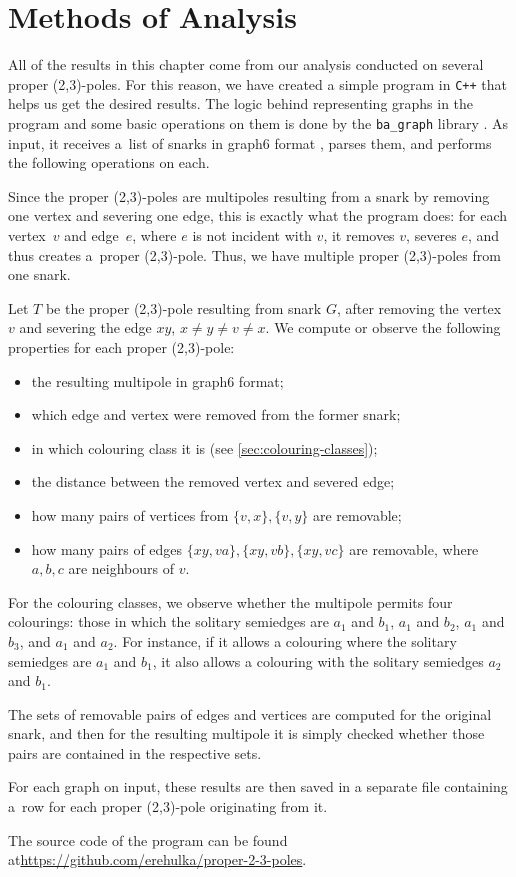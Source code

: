 \section{Methods of Analysis}\label{sec:analysis}

All of the results in this chapter come from our analysis conducted on several proper (2,3)-poles. For this reason, we have created a simple program in \texttt{C++} that helps us get the desired results. The logic behind representing graphs in the program and some basic operations on them is done by the \texttt{ba\_graph} library \cite{ba-graph}. As input, it receives a~list of snarks in graph6 format \cite{mckay_formats}, parses them, and performs the following operations on each.

Since the proper (2,3)-poles are multipoles resulting from a snark by removing one vertex and severing one edge, this is exactly what the program does: for each vertex~$v$ and edge~$e$, where $e$ is not incident with $v$, it removes $v$, severes $e$, and thus creates a~proper (2,3)-pole. Thus, we have multiple proper (2,3)-poles from one snark.

Let $T$ be the proper (2,3)-pole resulting from snark $G$, after removing the vertex $v$ and severing the edge $xy$, $x\neq y\neq v\neq x$. We compute or observe the following properties for each proper (2,3)-pole:

\begin{itemize}
	\item the resulting multipole in graph6 format;
	\item which edge and vertex were removed from the former snark;
	\item in which colouring class it is (see \cref{sec:colouring-classes});
	\item the distance between the removed vertex and severed edge;
	\item how many pairs of vertices from $\{v,x\},\{v,y\}$ are removable;
	\item how many pairs of edges $\{xy, va\}, \{xy, vb\}, \{xy, vc\}$ are removable, where $a,b,c$ are neighbours of $v$.
\end{itemize}

For the colouring classes, we observe whether the multipole permits four colourings: those in which the solitary semiedges are $a_1$ and $b_1$, $a_1$ and $b_2$, $a_1$ and $b_3$, and $a_1$ and $a_2$. For instance, if it allows a colouring where the solitary semiedges are $a_1$ and $b_1$, it also allows a colouring with the solitary semiedges $a_2$ and $b_1$.

The sets of removable pairs of edges and vertices are computed for the original snark, and then for the resulting multipole it is simply checked whether those pairs are contained in the respective sets.

For each graph on input, these results are then saved in a separate file containing a~row for each proper (2,3)-pole originating from it.

The source code of the program can be found at\newline \url{https://github.com/erehulka/proper-2-3-poles}.